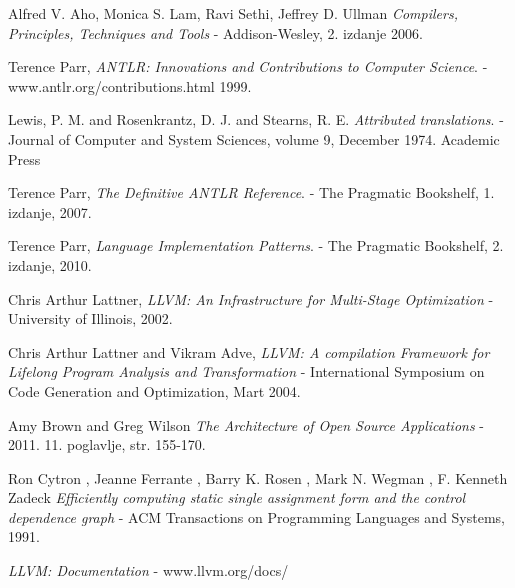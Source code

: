 \begin{thebibliography}{9}

	 Alfred V. Aho, Monica S. Lam, Ravi Sethi, Jeffrey D. Ullman
    \emph{Compilers, Principles, Techniques and Tools}
    - Addison-Wesley,
    2. izdanje
	2006.
   
	Terence Parr,
	\emph{ANTLR: Innovations and Contributions to Computer Science}.
	- www.antlr.org/contributions.html
	1999.

	Lewis, P. M. and Rosenkrantz, D. J. and Stearns, R. E.
	\emph{Attributed translations}.
	- Journal of Computer and System Sciences, 
	volume 9,
	December 1974.
	Academic Press

	Terence Parr,
	\emph{The Definitive ANTLR Reference}.
	- The Pragmatic Bookshelf,
	1. izdanje,
	2007.

	Terence Parr,
	\emph{Language Implementation Patterns}.
	- The Pragmatic Bookshelf,
	2. izdanje,
	2010.

	Chris Arthur Lattner,
	\emph{LLVM: An Infrastructure for Multi-Stage Optimization}
	- University of Illinois, 2002.
	
	Chris Arthur Lattner and Vikram Adve,
	\emph{LLVM: A compilation Framework for Lifelong Program Analysis and Transformation}
	- International Symposium on Code Generation and Optimization, Mart 2004.
	
	Amy Brown and Greg Wilson
	\emph{The Architecture of Open Source Applications}
	- 2011. 11. poglavlje, str. 155-170. 

	Ron Cytron , Jeanne Ferrante , Barry K. Rosen , Mark N. Wegman , F. Kenneth Zadeck
	\emph{Efficiently computing static single assignment form and the control dependence graph}
	- ACM Transactions on Programming Languages and Systems, 1991. 


	\emph{LLVM: Documentation}
	- www.llvm.org/docs/

\end{thebibliography}